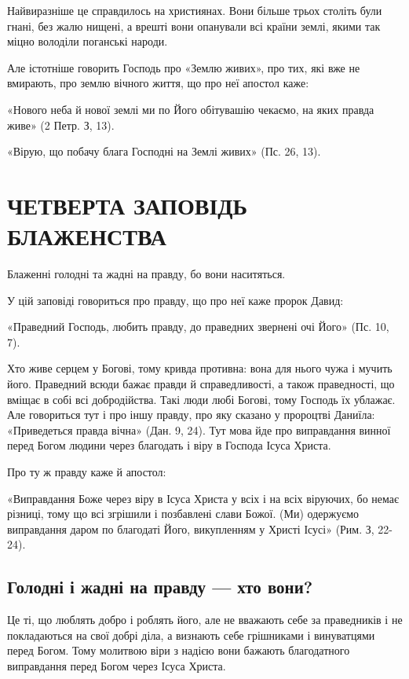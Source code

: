 \documentclass[main.tex]{subfiles}
\begin{document}
Найвиразніше це справдилось на християнах. Вони більше трьох століть були гнані, без жалю нищені, а врешті вони опанували всі країни землі, якими так міцно володіли поганські народи.

Але істотніше говорить Господь про «Землю живих», про тих, які вже не вмирають, про землю вічного життя, що про неї апостол каже:

«Нового неба й нової землі ми по Його обітувашію чекаємо, на яких правда живе» (2 Петр. З, 13).

«Вірую, що побачу блага Господні на Землі живих» (Пс. 26, 13).

\section{ЧЕТВЕРТА ЗАПОВІДЬ БЛАЖЕНСТВА}

Блаженні голодні та жадні на правду, бо вони наситяться.

У цій заповіді говориться про правду, що про неї каже пророк Давид:

«Праведний Господь, любить правду, до праведних звернені очі Його» (Пс. 10, 7).

Хто живе серцем у Богові, тому кривда противна: вона для нього чужа і мучить його. Праведний всюди бажає правди й справедливості, а також праведності, що вміщає в собі всі добродійства. Такі люди любі Богові, тому Господь їх ублажає. Але говориться тут і про іншу правду, про яку сказано у пророцтві Даниїла: «Приведеться правда вічна» (Дан. 9, 24). Тут мова йде про виправдання винної перед Богом людини через благодать і віру в Господа Ісуса Христа.

Про ту ж правду каже й апостол:

«Виправдання Боже через віру в Ісуса Христа у всіх і на всіх віруючих, бо немає різниці, тому що всі згрішили і позбавлені слави Божої. (Ми) одержуємо виправдання даром по благодаті Його, викупленням у Христі Ісусі» (Рим. З, 22-24).

\subsection{Голодні і жадні на правду — хто вони?}

Це ті, що люблять добро і роблять його, але не вважають себе за праведників і не покладаються на свої добрі діла, а визнають себе грішниками і винуватцями перед Богом. Тому молитвою віри з надією вони бажають благодатного виправдання перед Богом через Ісуса Христа.
\end{document}
